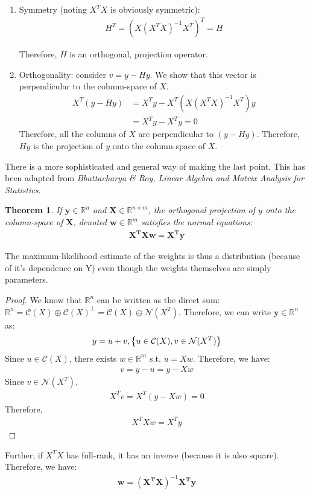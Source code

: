 \documentclass[submit]{harvardml}
\renewcommand{\v}{\boldsymbol}
\newtheorem*{theorem}{Theorem}
\begin{document}
\begin{enumerate}[label=(\alph*)]
\begin{enumerate}[label=(\roman*)]
		\item Symmetry (noting  $X^T X$ is obviously symmetric):
			\begin{align*}
				H^T = (X (X^T X)^{-1}X^T )^T = H
			\end{align*}
			
			Therefore, $H$ is an orthogonal, projection operator.
		\item Orthogonality: consider $v = y - H y$. We show that this vector is perpendicular to the column-space of $X$. 
			\begin{align*}
				X^T ( y - H y) &= X^T y - X^T (X (X^T X)^{-1}X^T ) y \\
								&= X^T y - X^T y = 0
			\end{align*}
			Therefore, all the columns of $X$ are perpendicular to $(y-Hy)$. Therefore, $Hy$ is the projection of $y$ onto the column-space of $X$.
	\end{enumerate}
	
There is a more sophisticated and general way of making the last point. This has been adapted from \textit{Bhattacharya \& Roy, Linear Algebra and Matrix Analysis for Statistics}.
	\begin{theorem}
		If $\v{y} \in \mathbb{R}^n$ and $\v{X} \in \mathbb{R}^{n \times m}$, the orthogonal projection of $y$ onto the column-space of $\v{X}$, denoted $\v{w} \in \mathbb{R}^m$ satisfies the normal equations:
			\begin{align*}
				\v{X^T X w} = \v{X^T y}
			\end{align*}
	\end{theorem}
	The maximum-likelihood estimate of the weights is thus a distribution (because of it's dependence on Y) even though the weights themselves are simply parameters.
	\begin{proof}
		We know that $\mathbb{R}^n$ can be written as the direct sum: $\mathbb{R}^n = \mathcal{C}(X) \oplus \mathcal{C}(X)^{\perp} =  \mathcal{C}(X) \oplus \mathcal{N}(X^T)$. Therefore, we can write $\v{y} \in \mathbb{R}^n$ as:
			\begin{align*}
			y = u + v, \space \left\{u \in \mathcal{C}(X), v  \in \mathcal{N}(X^T) \right \}
			\end{align*}
			Since $u \in \mathcal{C}(X)$, there exists $w \in \mathbb{R}^m$ s.t. $u = X w$. Therefore, we have:
			\begin{align*}
				v = y - u = y - X w
			\end{align*}
			Since $v  \in \mathcal{N}(X^T)$, 
			\begin{align*}
				X^T v = X^T (y - X w) = 0
			\end{align*}
			Therefore,
			\begin{align}
				X^T X w = X^T y
			\end{align}
	\end{proof}
	Further, if $X^T X$ has full-rank, it has an inverse (because it is also square). Therefore, we have:
		\begin{align}
			\v{w} = \v{(X^T X)}^{-1} \v{X^T y}
		\end{align}
	

\end{enumerate}
\end{document}
